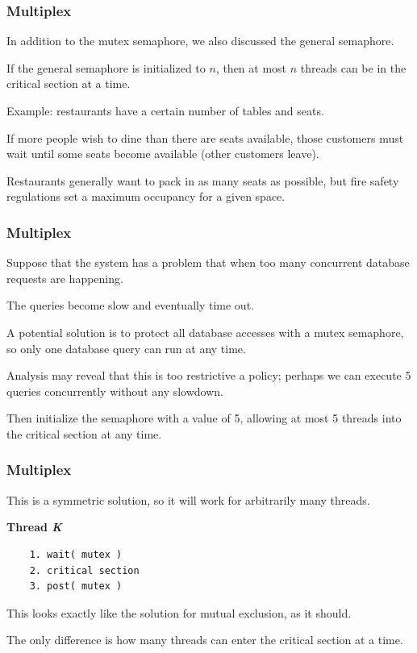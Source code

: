 \begin{frame}
	\frametitle{Multiplex}
	In addition to the mutex semaphore, we also discussed the general semaphore.

	If the general semaphore is initialized to $n$, then at most $n$ threads can be in the critical section at a time.

	Example: restaurants have a certain number of tables and seats.

	If more people wish to dine than there are seats available, those customers must wait until some seats become available (other customers leave).

	Restaurants generally want to pack in as many seats as possible, but fire safety regulations set a maximum occupancy for a given space.

\end{frame}

\begin{frame}
	\frametitle{Multiplex}

	Suppose that the system has a problem that when too many concurrent database requests are happening.

	The queries become slow and eventually time out.

	A potential solution is to protect all database accesses with a mutex semaphore, so only one database query can run at any time.

	Analysis may reveal that this is too restrictive a policy; perhaps we can execute 5 queries concurrently without any slowdown.

	Then initialize the semaphore with a value of 5, allowing at most 5 threads into the critical section at any time.


\end{frame}

\begin{frame}[fragile]
	\frametitle{Multiplex}


	This is a symmetric solution, so it will work for arbitrarily many threads.

	\textbf{Thread \textit{K}}\vspace{-6em}
	\begin{verbatim}
	1. wait( mutex )
	2. critical section
	3. post( mutex )
  	\end{verbatim}
	\vspace{-2em}

	This looks exactly like the solution for mutual exclusion, as it should.

	The only difference is how many threads can enter the critical section at a time.



\end{frame}



